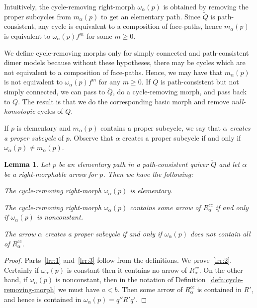 \documentclass{article}
\newtheorem{lemma}[thm]{Lemma}
\theoremstyle{definition}
\begin{document}
Intuitively, the cycle-removing right-morph $\omega_\alpha(p)$ is obtained by removing the proper subcycles from $m_\alpha(p)$ to get an elementary path. Since $\widetilde Q$ is path-consistent, any cycle is equivalent to a composition of face-paths, hence $m_\alpha(p)$ is equivalent to $\omega_\alpha(p)f^m$ for some $m\geq0$.

We define cycle-removing morphs only for simply connected and path-consistent dimer models because without these hypotheses, there may be cycles which are not equivalent to a composition of face-paths. Hence, we may have that $m_\alpha(p)$ is not equivalent to $\omega_\alpha(p)f^m$ for any $m\geq0$. If $Q$ is path-consistent but not simply connected, we can pass to $\widetilde Q$, do a cycle-removing morph, and pass back to $Q$. The result is that we do the corresponding basic morph and remove \textit{null-homotopic} cycles of $Q$.

If $p$ is elementary and $m_\alpha(p)$ contains a proper subcycle, we say that $\alpha$ \textit{creates a proper subcycle} of $p$. Observe that $\alpha$ creates a proper subcycle if and only if $\omega_\alpha(p)\neq m_\alpha(p)$.


\begin{lemma}\label{remk:cycle-removing-results}
    Let $p$ be an elementary path in a path-consistent quiver ${\widetilde Q}$ and let $\alpha$ be a right-morphable arrow for $p$. Then we have the following:
    \begin{enumerate}
        {\item\label{lrr:1} The cycle-removing right-morph $\omega_\alpha(p)$ is elementary.}
        {\item\label{lrr:2} The cycle-removing right-morph $\omega_\alpha(p)$ contains some arrow of $R_\alpha^{cc}$ if and only if $\omega_\alpha(p)$ is nonconstant.}
        {\item\label{lrr:3} The arrow $\alpha$ creates a proper subcycle if and only if $\omega_\alpha(p)$ does not contain all of $R_\alpha^{cc}$.}
    \end{enumerate}
\end{lemma}
\begin{proof}
	Parts~\eqref{lrr:1} and~\eqref{lrr:3} follow from the definitions. We prove~\eqref{lrr:2}. 
	Certainly if $\omega_\alpha(p)$ is constant then it contains no arrow of $R_\alpha^{cc}$. On the other hand, if $\omega_\alpha(p)$ is nonconstant, then in the notation of Definition~\ref{defn:cycle-removing-morph} we must have $a<b$. Then some arrow of $R_\alpha^{cc}$ is contained in $R'$, and hence is contained in $\omega_\alpha(p)=q''R'q'$.
\end{proof}
\end{document}
